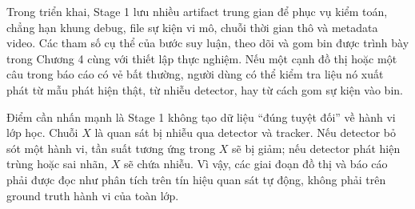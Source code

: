 Trong triển khai, Stage 1 lưu nhiều artifact trung gian để phục vụ kiểm toán, chẳng hạn khung debug, file sự kiện vi mô, chuỗi thời gian thô và metadata video. Các tham số cụ thể của bước suy luận, theo dõi và gom bin được trình bày trong Chương 4 cùng với thiết lập thực nghiệm. Nếu một cạnh đồ thị hoặc một câu trong báo cáo có vẻ bất thường, người dùng có thể kiểm tra liệu nó xuất phát từ mẫu phát hiện thật, từ nhiễu detector, hay từ cách gom sự kiện vào bin.

Điểm cần nhấn mạnh là Stage 1 không tạo dữ liệu ``đúng tuyệt đối'' về hành vi lớp học. Chuỗi \(X\) là quan sát bị nhiễu qua detector và tracker. Nếu detector bỏ sót một hành vi, tần suất tương ứng trong \(X\) sẽ bị giảm; nếu detector phát hiện trùng hoặc sai nhãn, \(X\) sẽ chứa nhiễu. Vì vậy, các giai đoạn đồ thị và báo cáo phải được đọc như phân tích trên tín hiệu quan sát tự động, không phải trên ground truth hành vi của toàn lớp.